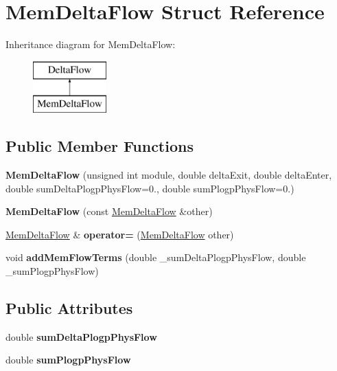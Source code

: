 \hypertarget{structMemDeltaFlow}{}\section{Mem\+Delta\+Flow Struct Reference}
\label{structMemDeltaFlow}
Inheritance diagram for Mem\+Delta\+Flow\+:\begin{figure}[H]
\begin{center}
\leavevmode
\includegraphics[height=2.000000cm]{structMemDeltaFlow}
\end{center}
\end{figure}
\subsection*{Public Member Functions}
\begin{DoxyCompactItemize}
\item 
\mbox{\label{structMemDeltaFlow_a967982ff861f75b78ad16aefef0c3ab4}} 
{\bfseries Mem\+Delta\+Flow} (unsigned int module, double delta\+Exit, double delta\+Enter, double sum\+Delta\+Plogp\+Phys\+Flow=0., double sum\+Plogp\+Phys\+Flow=0.)
\item 
\mbox{\label{structMemDeltaFlow_a8209cc563b4fd21f94d7fff62852ba02}} 
{\bfseries Mem\+Delta\+Flow} (const \mbox{\hyperlink{structMemDeltaFlow}{Mem\+Delta\+Flow}} \&other)
\item 
\mbox{\label{structMemDeltaFlow_ae2d5c5e22a13e1304f91acc9da27fe52}} 
\mbox{\hyperlink{structMemDeltaFlow}{Mem\+Delta\+Flow}} \& {\bfseries operator=} (\mbox{\hyperlink{structMemDeltaFlow}{Mem\+Delta\+Flow}} other)
\item 
\mbox{\label{structMemDeltaFlow_a5ddaae6a6e2f4c48e8d81a3ec992e5d6}} 
void {\bfseries add\+Mem\+Flow\+Terms} (double \+\_\+sum\+Delta\+Plogp\+Phys\+Flow, double \+\_\+sum\+Plogp\+Phys\+Flow)
\end{DoxyCompactItemize}
\subsection*{Public Attributes}
\begin{DoxyCompactItemize}
\item 
\mbox{\label{structMemDeltaFlow_aa3c8c5791f3fbc06a68167ab2fd46280}} 
double {\bfseries sum\+Delta\+Plogp\+Phys\+Flow}
\item 
\mbox{\label{structMemDeltaFlow_ac46a9a7cc0382cd1b347368dd018e125}} 
double {\bfseries sum\+Plogp\+Phys\+Flow}
\end{DoxyCompactItemize}
